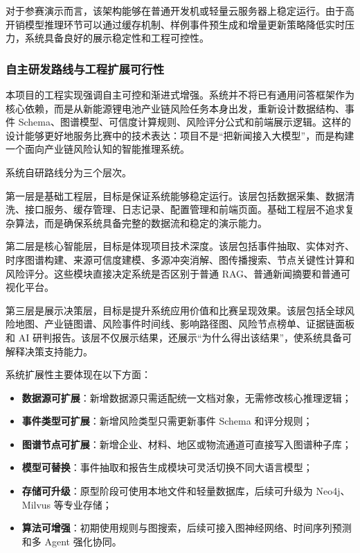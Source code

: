\documentclass[12pt,a4paper]{article}
\newcommand{\term}[1]{\textbf{#1}}
\begin{document}
对于参赛演示而言，该架构能够在普通开发机或轻量云服务器上稳定运行。由于高开销模型推理环节可以通过缓存机制、样例事件预生成和增量更新策略降低实时压力，系统具备良好的展示稳定性和工程可控性。

\subsubsection{自主研发路线与工程扩展可行性}

本项目的工程实现强调自主可控和渐进式增强。系统并不将已有通用问答框架作为核心依赖，而是从新能源锂电池产业链风险任务本身出发，重新设计数据结构、事件 Schema、图谱模型、可信度计算规则、风险评分公式和前端展示逻辑。这样的设计能够更好地服务比赛中的技术表达：项目不是“把新闻接入大模型”，而是构建一个面向产业链风险认知的智能推理系统。

系统自研路线分为三个层次。

第一层是基础工程层，目标是保证系统能够稳定运行。该层包括数据采集、数据清洗、接口服务、缓存管理、日志记录、配置管理和前端页面。基础工程层不追求复杂算法，而是确保系统具备完整的数据流和稳定的演示能力。

第二层是核心智能层，目标是体现项目技术深度。该层包括事件抽取、实体对齐、时序图谱构建、来源可信度建模、多源冲突消解、图传播搜索、节点关键性计算和风险评分。这些模块直接决定系统是否区别于普通 RAG、普通新闻摘要和普通可视化平台。

第三层是展示决策层，目标是提升系统应用价值和比赛呈现效果。该层包括全球风险地图、产业链图谱、风险事件时间线、影响路径图、风险节点榜单、证据链面板和 AI 研判报告。该层不仅展示结果，还展示“为什么得出该结果”，使系统具备可解释决策支持能力。

系统扩展性主要体现在以下方面：
\begin{itemize}
    \item \term{数据源可扩展}：新增数据源只需适配统一文档对象，无需修改核心推理逻辑；
    \item \term{事件类型可扩展}：新增风险类型只需更新事件 Schema 和评分规则；
    \item \term{图谱节点可扩展}：新增企业、材料、地区或物流通道可直接写入图谱种子库；
    \item \term{模型可替换}：事件抽取和报告生成模块可灵活切换不同大语言模型；
    \item \term{存储可升级}：原型阶段可使用本地文件和轻量数据库，后续可升级为 Neo4j、Milvus 等专业存储；
    \item \term{算法可增强}：初期使用规则与图搜索，后续可接入图神经网络、时间序列预测和多 Agent 强化协同。
\end{itemize}
\end{document}
